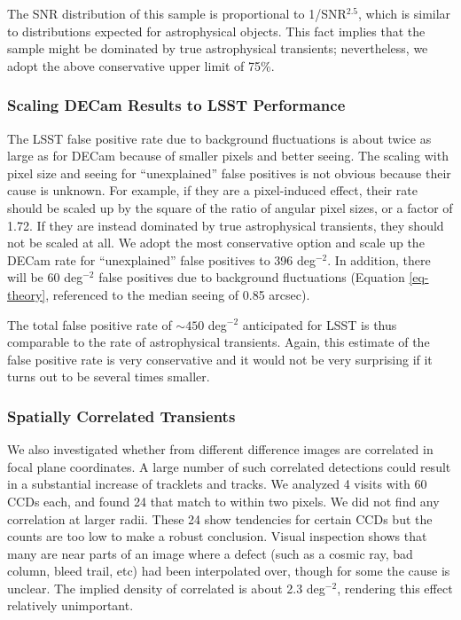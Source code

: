 The SNR distribution of this sample is proportional to 1/SNR$^{2.5}$, which
is similar to distributions expected for astrophysical objects. This fact implies
that the sample might be dominated by true astrophysical transients; nevertheless,
we adopt the above conservative upper limit of 75\%.


\subsubsection{Scaling DECam Results to LSST Performance}

The LSST false positive rate due to background fluctuations is about twice
as large as for DECam because of smaller pixels and better seeing. The scaling
with pixel size and seeing for ``unexplained'' false positives is not obvious
because their cause is unknown. For example, if they are a pixel-induced effect,
their rate should be scaled up by the square of the ratio of angular pixel sizes, or
a factor of 1.72. If they are instead dominated by true astrophysical transients,
they should not be scaled at all. We adopt the most conservative option and
scale up the DECam rate for ``unexplained'' false positives to 396 deg$^{-2}$.
In addition, there will be 60 deg$^{-2}$ false positives due to background
fluctuations (Equation \ref{eq-theory}, referenced to the median seeing of 0.85 arcsec).

The total false positive rate of $\sim450$ deg$^{-2}$ anticipated for LSST is thus
comparable to the rate of astrophysical transients. Again, this estimate of the false
positive rate is very conservative and it would not be very surprising if it turns out
to be several times smaller.

\subsubsection{Spatially Correlated Transients}


We also investigated whether \DIASources from different difference images are correlated
in focal plane coordinates. A large number of such correlated detections could result in
a substantial increase of tracklets and tracks. We analyzed 4 visits with 60 CCDs each,
and found 24 \DIASources that match to within two pixels. We did not find any correlation at
larger radii. These 24 \DIASources show tendencies for certain CCDs but the counts are too
low to make a robust conclusion. Visual inspection shows that many are near
parts of an image where a defect (such as a cosmic ray, bad column, bleed trail,
etc) had been interpolated over, though for some the cause is unclear. The
implied density of correlated
\DIASources is about 2.3 deg$^{-2}$, rendering this effect relatively unimportant.
